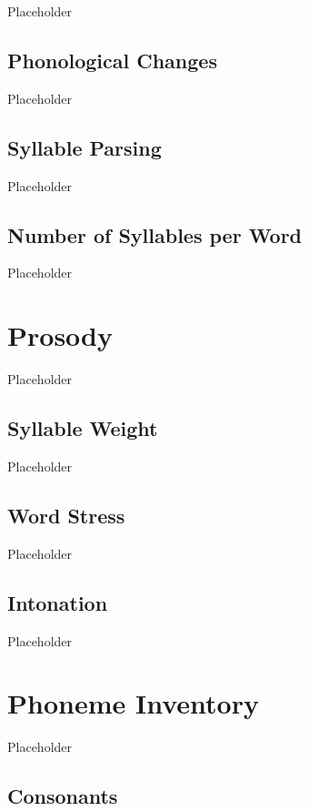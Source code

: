 Placeholder

\subsection{Phonological Changes}
\label{subsec:ank-phone-changes}

Placeholder

\subsection{Syllable Parsing}
\label{subsec:ank-syll-parse}

Placeholder

\subsection{Number of Syllables per Word}
\label{subsec:ank-num-syll}

Placeholder

\section{\langank{} Prosody}
\label{sec:ank-prosody}

Placeholder

\subsection{Syllable Weight}
\label{subsec:ank-syll-weight}

Placeholder

\subsection{Word Stress}
\label{subsec:ank-word-stress}

Placeholder

\subsection{Intonation}
\label{subsec:ank-intonation}

Placeholder

\section{\langrdk{} Phoneme Inventory}
\label{sec:rdk-phone-inventory}

Placeholder

\subsection{Consonants}
\label{subsec:rdk-consonants}

